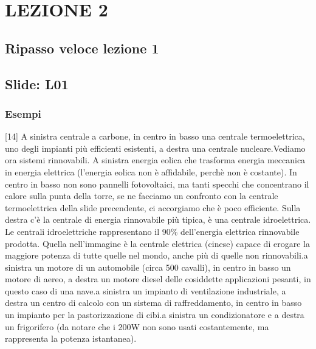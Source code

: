 \section{LEZIONE 2}
\subsection{Ripasso veloce lezione 1}
\subsection{Slide: L01}
\subsubsection{Esempi}
[14] A sinistra centrale a carbone, in centro in basso una centrale termoelettrica, uno degli impianti più efficienti esistenti, a destra una centrale nucleare.\newline
[15] Vediamo ora sistemi rinnovabili. A sinistra energia eolica che trasforma energia meccanica in energia elettrica (l'energia eolica non è affidabile, perchè non è costante). In centro in basso non sono pannelli fotovoltaici, ma tanti specchi che concentrano il calore sulla punta della torre, se ne facciamo un confronto con la centrale termoelettrica della slide precendente, ci accorgiamo che è poco efficiente. Sulla destra c'è la centrale di energia rinnovabile più tipica, è una centrale idroelettrica. Le centrali idroelettriche rappresentano il 90\% dell'energia elettrica rinnovabile prodotta. Quella nell'immagine è la centrale elettrica (cinese) capace di erogare la maggiore potenza di tutte quelle nel mondo, anche più di quelle non rinnovabili.\newline
[16] a sinistra un motore di un automobile (circa 500 cavalli), in centro in basso un motore di aereo, a destra un motore diesel delle cosiddette applicazioni pesanti, in questo caso di una nave.\newline
[17] a sinistra un impianto di ventilazione industriale, a destra un centro di calcolo con un sistema di raffreddamento, in centro in basso un impianto per la pastorizzazione di cibi.\newline
[18] a sinistra un condizionatore e a destra un frigorifero (da notare che i 200W non sono usati costantemente, ma rappresenta la potenza istantanea).\newline
